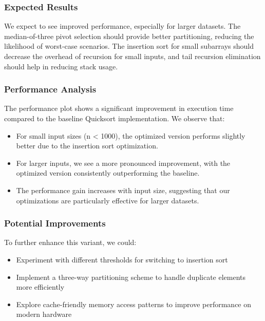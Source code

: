 \documentclass[twocolumn]{article}
\begin{document}
\subsubsection{Expected Results}
We expect to see improved performance, especially for larger datasets. The median-of-three pivot selection should provide better partitioning, reducing the likelihood of worst-case scenarios. The insertion sort for small subarrays should decrease the overhead of recursion for small inputs, and tail recursion elimination should help in reducing stack usage.

\subsubsection{Performance Analysis}

The performance plot shows a significant improvement in execution time compared to the baseline Quicksort implementation. We observe that:
\begin{itemize}
    \item For small input sizes (n < 1000), the optimized version performs slightly better due to the insertion sort optimization.
    \item For larger inputs, we see a more pronounced improvement, with the optimized version consistently outperforming the baseline.
    \item The performance gain increases with input size, suggesting that our optimizations are particularly effective for larger datasets.
\end{itemize}

\subsubsection{Potential Improvements}
To further enhance this variant, we could:
\begin{itemize}
    \item Experiment with different thresholds for switching to insertion sort
    \item Implement a three-way partitioning scheme to handle duplicate elements more efficiently
    \item Explore cache-friendly memory access patterns to improve performance on modern hardware
\end{itemize}
\end{document}
